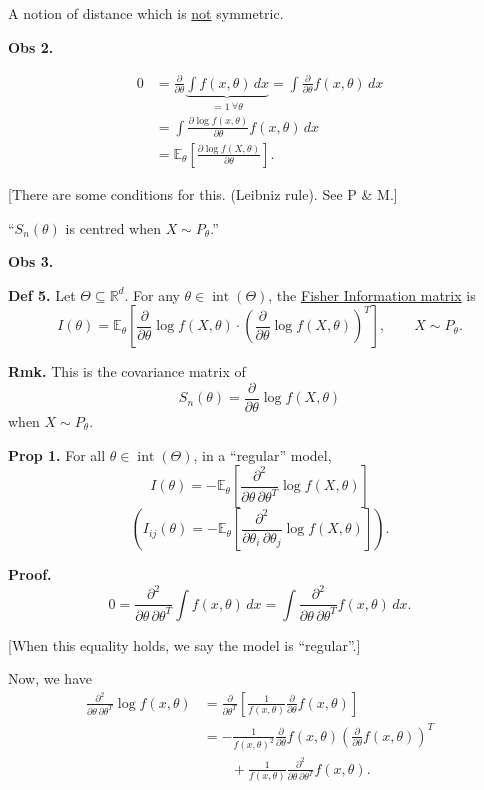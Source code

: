 \documentclass[11pt,a4paper]{article}
\begin{document}
A notion of distance which is \underline{not} symmetric.

\medskip
\noindent\textbf{Obs 2.}

\[
\begin{aligned}
0
&=
\frac{\partial}{\partial\theta}
\underbrace{\int f(x,\theta)\,dx}_{=1\ \forall\theta}
=
\int\frac{\partial}{\partial\theta}f(x,\theta)\,dx
\\
&=
\int
\frac{\partial\log f(x,\theta)}{\partial\theta}
f(x,\theta)\,dx
\\
&=
\mathbb{E}_{\theta}
\left[
\frac{\partial\log f(X,\theta)}{\partial\theta}
\right].
\end{aligned}
\]

[There are some conditions for this.
(Leibniz rule). See P \& M.]

``$S_n(\theta)$ is centred when $X\sim P_\theta$.''

\medskip
\noindent\textbf{Obs 3.}

\medskip
\noindent\textbf{Def 5.}
Let $\Theta\subseteq\mathbb{R}^d$.
For any $\theta\in\operatorname{int}(\Theta)$,
the \underline{Fisher Information matrix} is
\[
I(\theta)
=
\mathbb{E}_{\theta}
\left[
\frac{\partial}{\partial\theta}\log f(X,\theta)
\cdot
\left(
\frac{\partial}{\partial\theta}\log f(X,\theta)
\right)^T
\right],
\qquad
X\sim P_\theta.
\]

\medskip
\noindent\textbf{Rmk.}
This is the covariance matrix of
\[
S_n(\theta)
=
\frac{\partial}{\partial\theta}\log f(X,\theta)
\]
when $X\sim P_\theta$.

\medskip
\noindent\textbf{Prop 1.}
For all $\theta\in\operatorname{int}(\Theta)$, in a ``regular'' model,
\[
I(\theta)
=
-\mathbb{E}_{\theta}
\left[
\frac{\partial^2}{\partial\theta\,\partial\theta^T}
\log f(X,\theta)
\right]
\]
\[
\left(
I_{ij}(\theta)
=
-\mathbb{E}_{\theta}
\left[
\frac{\partial^2}{\partial\theta_i\,\partial\theta_j}
\log f(X,\theta)
\right]
\right).
\]

\medskip
\noindent\textbf{Proof.}
\[
0
=
\frac{\partial^2}{\partial\theta\,\partial\theta^T}
\int f(x,\theta)\,dx
=
\int
\frac{\partial^2}{\partial\theta\,\partial\theta^T}
f(x,\theta)\,dx.
\]

[When this equality holds, we say the model is ``regular''.]

Now, we have
\[
\begin{aligned}
\frac{\partial^2}{\partial\theta\,\partial\theta^T}
\log f(x,\theta)
&=
\frac{\partial}{\partial\theta^T}
\left[
\frac{1}{f(x,\theta)}
\frac{\partial}{\partial\theta}f(x,\theta)
\right]
\\
&=
-\frac{1}{f(x,\theta)^2}
\frac{\partial}{\partial\theta}f(x,\theta)
\left(
\frac{\partial}{\partial\theta}f(x,\theta)
\right)^T
\\
&\qquad
+
\frac{1}{f(x,\theta)}
\frac{\partial^2}{\partial\theta\,\partial\theta^T}
f(x,\theta).
\end{aligned}
\]
\end{document}
